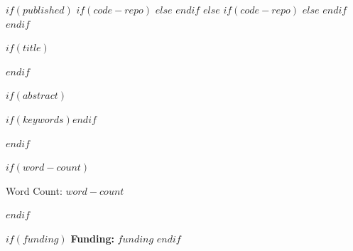 

% 
% 
% 


$if(published)$
$if(code-repo)$
$else$
$endif$
$else$
$if(code-repo)$
$else$
$endif$
$endif$

\vspace{0.25in}

$if(title)$
\maketitle
$endif$

\vspace{0.25in}


$if(abstract)$
\begin{abstract}
\noindent            %
$abstract$
\end{abstract}

\vspace{\baselineskip}

$if(keywords)$\indent {}$endif$

$endif$

\vspace{0.25in}


$if(word-count)$
{
\begin{center} 
Word Count: $word-count$
\end{center}
}
$endif$

\vspace{0.25in}


$if(funding)$
\noindent 
\textbf{Funding: }$funding$
$endif$

